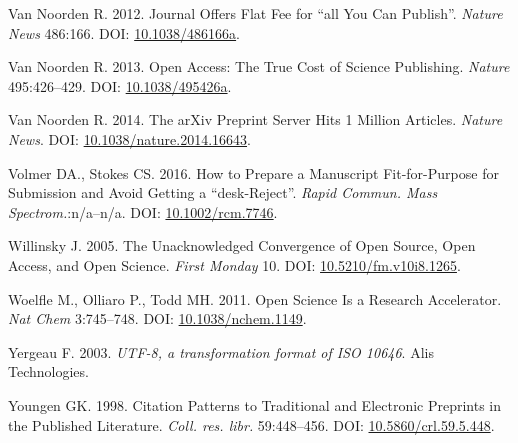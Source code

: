 \documentclass[10pt,fleqn]{wlpeerj}
\begin{document}
\hypertarget{ref-vanux5fnoordenux5fjournalux5f2012}{}
Van Noorden R. 2012. Journal Offers Flat Fee for ``all You Can
Publish''. \emph{Nature News} 486:166. DOI:
\href{https://doi.org/10.1038/486166a}{10.1038/486166a}.

\hypertarget{ref-vanux5fnoordenux5fopenux5f2013}{}
Van Noorden R. 2013. Open Access: The True Cost of Science Publishing.
\emph{Nature} 495:426--429. DOI:
\href{https://doi.org/10.1038/495426a}{10.1038/495426a}.

\hypertarget{ref-vanux5fnoordenux5farxivux5f2014}{}
Van Noorden R. 2014. The arXiv Preprint Server Hits 1 Million Articles.
\emph{Nature News}. DOI:
\href{https://doi.org/10.1038/nature.2014.16643}{10.1038/nature.2014.16643}.

\hypertarget{ref-volmerux5fhowux5f2016}{}
Volmer DA., Stokes CS. 2016. How to Prepare a Manuscript Fit-for-Purpose
for Submission and Avoid Getting a ``desk-Reject''. \emph{Rapid Commun.
Mass Spectrom.}:n/a--n/a. DOI:
\href{https://doi.org/10.1002/rcm.7746}{10.1002/rcm.7746}.

\hypertarget{ref-willinskyux5funacknowledgedux5f2005}{}
Willinsky J. 2005. The Unacknowledged Convergence of Open Source, Open
Access, and Open Science. \emph{First Monday} 10. DOI:
\href{https://doi.org/10.5210/fm.v10i8.1265}{10.5210/fm.v10i8.1265}.

\hypertarget{ref-woelfleux5fopenux5f2011}{}
Woelfle M., Olliaro P., Todd MH. 2011. Open Science Is a Research
Accelerator. \emph{Nat Chem} 3:745--748. DOI:
\href{https://doi.org/10.1038/nchem.1149}{10.1038/nchem.1149}.

\hypertarget{ref-rfc3629}{}
Yergeau F. 2003. \emph{UTF-8, a transformation format of ISO 10646}.
Alis Technologies.

\hypertarget{ref-youngenux5fcitationux5f1998}{}
Youngen GK. 1998. Citation Patterns to Traditional and Electronic
Preprints in the Published Literature. \emph{Coll. res. libr.}
59:448--456. DOI:
\href{https://doi.org/10.5860/crl.59.5.448}{10.5860/crl.59.5.448}.
\end{document}
